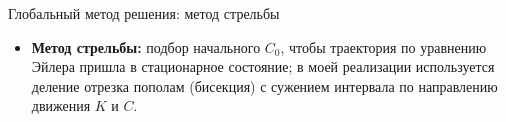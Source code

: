 \documentclass[
aspectratio=169,	%
LEEC,				%
portuguese,			%
]{DEEclassP}
\begin{document}




\begin{frame}{Глобальный метод решения: метод стрельбы}
    \scriptsize

    \vspace{0.25em}
    \begin{itemize}
        \item \textbf{Метод стрельбы:} подбор начального \(C_0\), чтобы траектория по уравнению Эйлера пришла в стационарное состояние; в моей реализации используется деление отрезка пополам (бисекция) с сужением интервала по направлению движения \(K\) и \(C\).
    \end{itemize}
\end{frame}
\end{document}
